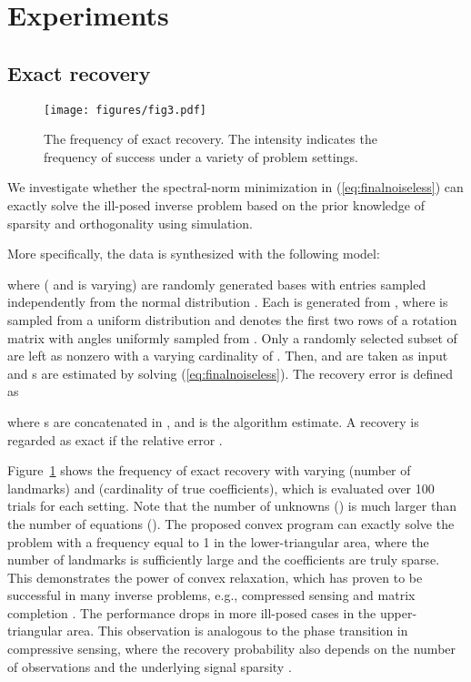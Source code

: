 \documentclass[10pt,journal,cspaper,compsoc]{IEEEtran}
\newcommand{\refEq}[1]{(\ref{#1})}
\newcommand{\refFig}[1]{Figure~\ref{#1}}
\begin{document}
\section{Experiments}\label{sec:experiments}

\subsection{Exact recovery}\label{sec:simulation}

\begin{figure}
\centering
\texttt{[image: figures/fig3.pdf]}
\caption{The frequency of exact recovery. The intensity indicates the frequency of success under a variety of problem settings.} \label{fig:freqexact}
\vspace{-1em}
\end{figure}

We investigate whether the spectral-norm minimization in \refEq{eq:finalnoiseless} can exactly solve the ill-posed inverse problem based on the prior knowledge of sparsity and orthogonality using simulation.

More specifically, the data is synthesized with the following model:

where  ( and  is varying) are randomly generated bases with entries sampled independently from the normal distribution . Each  is generated from , where  is sampled from a uniform distribution  and  denotes the first two rows of a rotation matrix with angles uniformly sampled from . Only a randomly selected subset of  are left as nonzero with a varying cardinality of . Then,  and  are taken as input and s are estimated by solving \refEq{eq:finalnoiseless}. The recovery error is defined as

where s are concatenated in , and  is the algorithm estimate. A recovery is regarded as exact if the relative error .

\refFig{fig:freqexact} shows the frequency of exact recovery with varying  (number of landmarks) and  (cardinality of true coefficients), which is evaluated over 100 trials for each setting. Note that the number of unknowns () is much larger than the number of equations (). The proposed convex program can exactly solve the problem with a frequency equal to 1 in the lower-triangular area, where the number of landmarks is sufficiently large and the coefficients are truly sparse. This demonstrates the power of convex relaxation, which has proven to be successful in many inverse problems, e.g., compressed sensing \cite{candes2008introduction} and matrix completion \cite{candes2010power}. The performance drops in more ill-posed cases in the upper-triangular area. This observation is analogous to the phase transition in compressive sensing, where the recovery probability also depends on the number of observations and the underlying signal sparsity \cite{donoho2009observed}.
\end{document}
